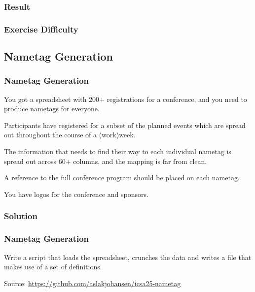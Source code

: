 {\subsubsection{Result}
\begin{frame}[fragile]
  \frametitle{Exercise Difficulty }
\end{frame}

\subsection{Nametag Generation}
\begin{frame}[fragile]
  \frametitle{Nametag Generation}
  \pause
  \vspace{3mm}
  You got a spreadsheet with 200+ registrations for a conference, and you need to produce nametags for everyone.
  
  \pause
  \vspace{5mm}
  Participants have registered for a subset of the planned events which are spread out throughout the course of a (work)week.
  
  \pause
  \vspace{5mm}
  The information that needs to find their way to each individual nametag is spread out across 60+ columns, and the mapping is far from clean.
  
  \pause
  \vspace{5mm}
  A reference to the full conference program should be placed on each nametag.
  
  \pause
  \vspace{5mm}
  You have logos for the conference and sponsors.
\end{frame}

\subsubsection{Solution}
\begin{frame}[fragile]
  \frametitle{Nametag Generation }
  \vspace{3mm}
  Write a script that loads the spreadsheet, crunches the data and writes a  file that makes use of a set of definitions.
  
  \vspace{5mm}
  Source: \textcolor{blue}{\url{https://github.com/aslakjohansen/icsa25-nametag}}
\end{frame}

}
